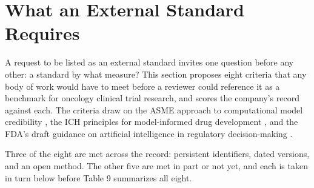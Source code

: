 \section{What an External Standard Requires}

A request to be listed as an external standard invites one question before any
other: a standard by what measure? This section proposes eight criteria that any
body of work would have to meet before a reviewer could reference it as a
benchmark for oncology clinical trial research, and scores the company's record
against each. The criteria draw on the ASME approach to computational model
credibility \cite{asmevv40}, the ICH principles for model-informed drug
development \cite{ichm15}, and the FDA's draft guidance on artificial
intelligence in regulatory decision-making \cite{fdaaiguidance2025}.

Three of the eight are met across the record: persistent identifiers, dated
versions, and an open method. The other five are met in part or not yet, and
each is taken in turn below before Table 9 summarizes all eight.

